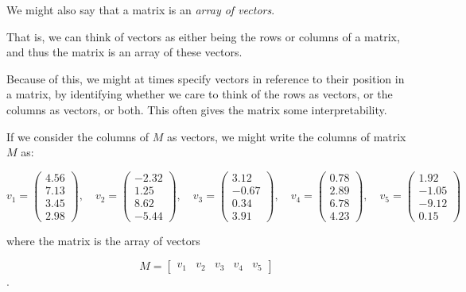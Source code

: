 \documentclass{ximera}
\begin{document}
\begin{definition}\label{def:matrixasarray}

    We might also say that a matrix is an \emph{array of vectors}. 
    
    That is, we can think of vectors as either being the rows or columns of a matrix, and thus the matrix is an array of these vectors.

\end{definition}

Because of this, we might at times specify vectors in reference to their position in a matrix, by identifying whether we care to think of the rows as vectors, or the columns as vectors, or both. This often gives the matrix some interpretability.

\begin{example}

    If we consider the columns of $M$ as vectors, we might write the columns of matrix $M$ as: 

    \[
v_1 = \begin{pmatrix} 4.56 \\ 7.13 \\ 3.45 \\ 2.98 \end{pmatrix}, \quad
v_2 = \begin{pmatrix} -2.32 \\ 1.25 \\ 8.62 \\ -5.44 \end{pmatrix}, \quad
v_3 = \begin{pmatrix} 3.12 \\ -0.67 \\ 0.34 \\ 3.91 \end{pmatrix}, \quad
v_4 = \begin{pmatrix} 0.78 \\ 2.89 \\ 6.78 \\ 4.23 \end{pmatrix}, \quad
v_5 = \begin{pmatrix} 1.92 \\ -1.05 \\ -9.12 \\ 0.15 \end{pmatrix}
\]

where the matrix is the array of vectors

    \[
M =
\left[\begin{array}{ccccc}
  v_1 & v_2 & v_3 & v_4 & v_5
\end{array}
\right]
\].


\end{example}
\end{document}
